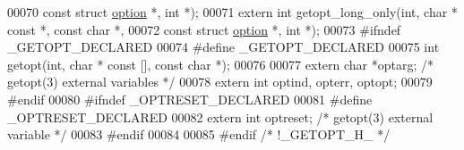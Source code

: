 \begin{DoxyCode}
00070     \textcolor{keyword}{const} \textcolor{keyword}{struct} \hyperlink{structoption}{option} *, \textcolor{keywordtype}{int} *);
00071 \textcolor{keyword}{extern} \textcolor{keywordtype}{int}  getopt\_long\_only(\textcolor{keywordtype}{int}, \textcolor{keywordtype}{char} * \textcolor{keyword}{const} *, \textcolor{keyword}{const} \textcolor{keywordtype}{char} *,
00072     \textcolor{keyword}{const} \textcolor{keyword}{struct} \hyperlink{structoption}{option} *, \textcolor{keywordtype}{int} *);
00073 \textcolor{preprocessor}{#ifndef \_GETOPT\_DECLARED}
00074 \textcolor{preprocessor}{#define \_GETOPT\_DECLARED}
00075 \textcolor{keywordtype}{int}  getopt(\textcolor{keywordtype}{int}, \textcolor{keywordtype}{char} * \textcolor{keyword}{const} [], \textcolor{keyword}{const} \textcolor{keywordtype}{char} *);
00076 
00077 \textcolor{keyword}{extern} \textcolor{keywordtype}{char} *optarg;            \textcolor{comment}{/* getopt(3) external variables */}
00078 \textcolor{keyword}{extern} \textcolor{keywordtype}{int} optind, opterr, optopt;
00079 \textcolor{preprocessor}{#endif}
00080 \textcolor{preprocessor}{#ifndef \_OPTRESET\_DECLARED}
00081 \textcolor{preprocessor}{#define \_OPTRESET\_DECLARED}
00082 \textcolor{keyword}{extern} \textcolor{keywordtype}{int} optreset;            \textcolor{comment}{/* getopt(3) external variable */}
00083 \textcolor{preprocessor}{#endif}
00084 
00085 \textcolor{preprocessor}{#endif }\textcolor{comment}{/* !\_GETOPT\_H\_ */}\textcolor{preprocessor}{}
\end{DoxyCode}
